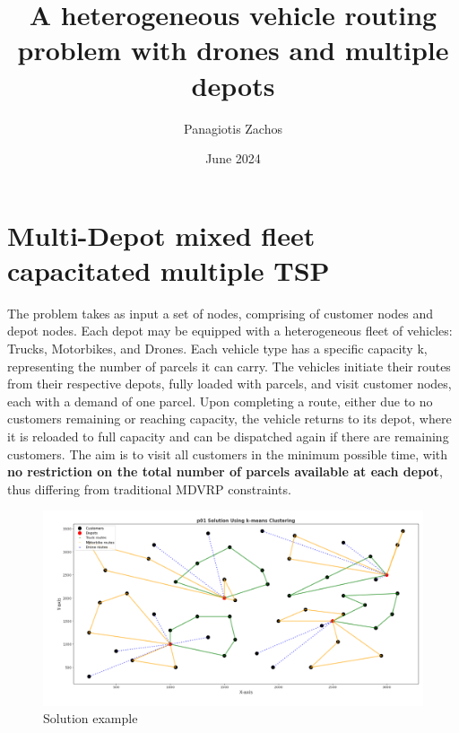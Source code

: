 \documentclass{article}
\title{A heterogeneous vehicle routing problem with drones and multiple depots}
\author{Panagiotis Zachos}
\date{June 2024}
\begin{document}
	\maketitle
	
	\section{Multi-Depot mixed fleet capacitated multiple TSP}
	The problem takes as input a set of nodes, comprising of customer nodes and depot nodes. Each depot may be equipped with a heterogeneous fleet of vehicles: Trucks, Motorbikes, and Drones. Each vehicle type has a specific capacity k, representing the number of parcels it can carry. The vehicles initiate their routes from their respective depots, fully loaded with parcels, and visit customer nodes, each with a demand of one parcel. Upon completing a route, either due to no customers remaining or reaching capacity,  the vehicle returns to its depot, where it is reloaded to full capacity and can be dispatched again if there are remaining customers. The aim is to visit all customers in the minimum possible time, with \textbf{no restriction on the total number of parcels available at each depot}, thus differing from traditional MDVRP constraints.
	\par
	\begin{figure}[h]
		\caption{Solution example}
		\centering
		\includegraphics[width=\textwidth]{Solution-example}
	\end{figure}
	\twocolumn
\end{document}
